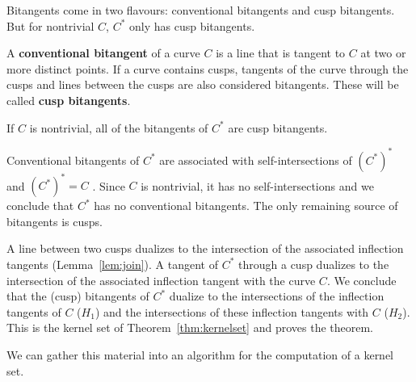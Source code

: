\documentclass[12pt]{article}
\begin{document}

Bitangents come in two flavours: conventional bitangents and cusp bitangents.
But for nontrivial $C$, $C^*$ only has cusp bitangents.

\begin{defn2}
\label{defn:bitang}
A {\bf conventional bitangent} of a curve $C$ is a line
that is tangent to $C$ at two or more distinct points.
If a curve contains cusps, tangents of the curve through the cusps
and lines between the cusps are also considered bitangents.
These will be called {\bf cusp bitangents}.
\end{defn2}

\begin{lemma}
If $C$ is nontrivial,
all of the bitangents of $C^*$ are cusp bitangents.
\end{lemma}
\prf
Conventional bitangents of $C^*$ are associated
with self-intersections of $(C^*)^*$ 
and $(C^*)^* = C$ \cite{jj02}.
Since $C$ is nontrivial, it has no self-intersections
and we conclude that $C^*$ has no conventional bitangents.
The only remaining source of bitangents is cusps.
\QED

\vspace{-.2in}

A line between two cusps dualizes to the intersection of the associated inflection
tangents (Lemma~\ref{lem:join}).
A tangent of $C^*$ through a cusp dualizes to the intersection of 
the associated inflection tangent with the curve $C$.
We conclude that the (cusp) bitangents of $C^*$ dualize to
the intersections of the inflection tangents of $C$ ($H_1$) 
and the intersections of these inflection tangents with $C$
($H_2$).
This is the kernel set of Theorem~\ref{thm:kernelset}
and proves the theorem.

We can gather this material into an algorithm
for the computation of a kernel set.
\end{document}
